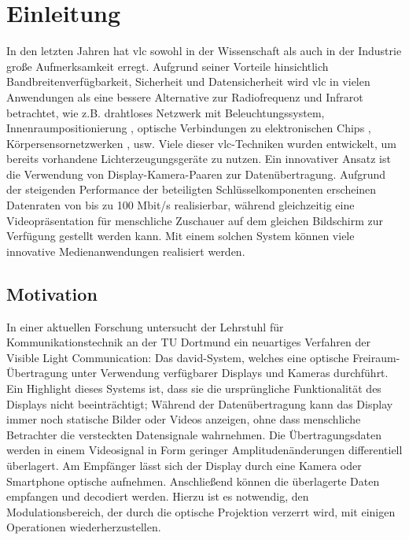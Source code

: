 \chapter{Einleitung} \label{cha:Einleitung}

In den letzten Jahren hat \gls{vlc} sowohl in der Wissenschaft als auch in der Industrie große Aufmerksamkeit erregt. Aufgrund seiner Vorteile hinsichtlich Bandbreitenverfügbarkeit, Sicherheit und Datensicherheit wird \gls{vlc} in vielen Anwendungen als eine bessere Alternative zur Radiofrequenz und Infrarot betrachtet, wie z.B. drahtloses Netzwerk mit Beleuchtungssystem\cite{1205458}, Innenraumpositionierung \cite{4649677}, optische Verbindungen zu elektronischen Chips \cite{867694}, Körpersensornetzwerken \cite{bodysensor}, usw. Viele dieser \gls{vlc}-Techniken wurden entwickelt, um bereits vorhandene Lichterzeugungsgeräte zu nutzen. Ein innovativer Ansatz ist die Verwendung von Display-Kamera-Paaren zur Datenübertragung. Aufgrund der steigenden Performance der beteiligten Schlüsselkomponenten erscheinen Datenraten von bis zu 100 Mbit/s realisierbar, während gleichzeitig eine Videopräsentation für menschliche Zuschauer auf dem gleichen Bildschirm zur Verfügung gestellt werden kann. Mit einem solchen System können viele innovative Medienanwendungen realisiert werden.

\section{Motivation} 

In einer aktuellen Forschung untersucht der Lehrstuhl für Kommunikationstechnik an der TU Dortmund ein neuartiges Verfahren der Visible Light Communication: Das \gls{david}-System, welches eine optische Freiraum-Übertragung unter Verwendung verfügbarer Displays und Kameras durchführt. Ein Highlight dieses Systems ist, dass sie die ursprüngliche Funktionalität des Displays nicht beeinträchtigt; Während der Datenübertragung kann das Display immer noch statische Bilder oder Videos anzeigen, ohne dass menschliche Betrachter die versteckten Datensignale wahrnehmen. Die Übertragungsdaten werden in einem Videosignal in Form geringer Amplitudenänderungen differentiell überlagert. Am Empfänger lässt sich der Display durch eine Kamera oder Smartphone optische aufnehmen. Anschließend können die überlagerte Daten empfangen und decodiert werden. Hierzu ist es notwendig, den Modulationsbereich, der durch die optische Projektion verzerrt wird, mit einigen Operationen wiederherzustellen.

